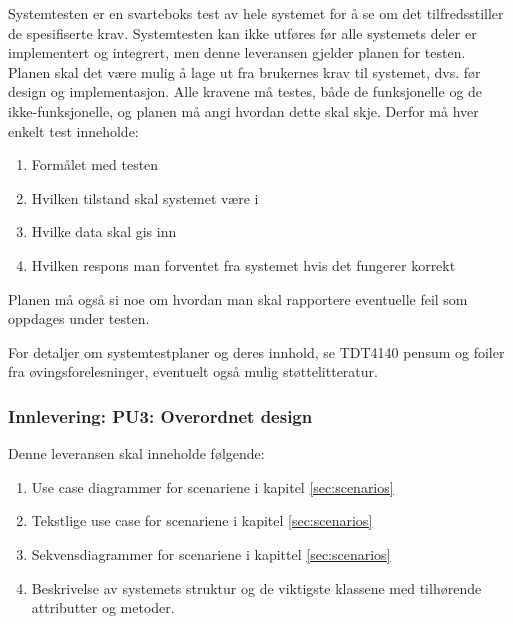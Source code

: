 Systemtesten er en svarteboks test av hele systemet for å se om det tilfredsstiller de spesifiserte krav. Systemtesten kan ikke utføres før alle systemets deler er implementert og integrert, men denne leveransen gjelder planen for testen. Planen skal det være mulig å lage ut fra brukernes krav til systemet, dvs. før design og implementasjon. Alle kravene må testes, både de funksjonelle og de ikke-funksjonelle, og planen må angi hvordan dette skal skje. Derfor må hver enkelt test inneholde:

\begin{enumerate}

\item
Formålet med testen

\item
Hvilken tilstand skal systemet være i

\item
Hvilke data skal gis inn

\item
Hvilken respons man forventet fra systemet hvis det fungerer korrekt

\end{enumerate}

Planen må også si noe om hvordan man skal rapportere eventuelle feil som oppdages under testen.

For detaljer om systemtestplaner og deres innhold, se TDT4140 pensum og foiler fra øvingsforelesninger, eventuelt også mulig støttelitteratur.

\subsubsection{Innlevering: PU3: Overordnet design}

Denne leveransen skal inneholde følgende:

\begin{enumerate}

\item
    Use case diagrammer for scenariene i kapitel \ref{sec:scenarios}

\item
    Tekstlige use case for scenariene i kapitel \ref{sec:scenarios}

\item
    Sekvensdiagrammer for scenariene i kapittel \ref{sec:scenarios}

\item
Beskrivelse av systemets struktur og de viktigste klassene med tilhørende attributter og metoder.

\end{enumerate}

